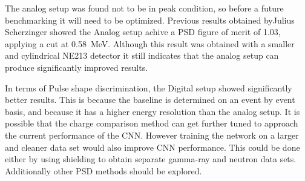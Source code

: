 \documentclass[main.tex]{subfiles}
\begin{document}
The analog setup was found not to be in peak condition, so before a future benchmarking it will need to be optimized. Previous results obtained byJulius Scherzinger showed the Analog setup achive a PSD figure of merit of 1.03, applying a cut at \SI{0.58}{\MeV}\cite{ScherzingerPhd}. Although this result was obtained with a smaller and cylindrical NE213 detector it still indicates that the analog setup can produce significantly improved results.

In terms of Pulse shape discrimination, the Digital setup showed significantly better results. This is because the baseline is determined on an event by event basis, and because it has a higher energy resolution than the analog setup. It is possible that the charge comparison method can get further tuned to approach the current performance of the CNN. However training the network on a larger and cleaner data set would also improve CNN performance. This could be done either by using shielding to obtain separate gamma-ray and neutron data sets. Additionally other PSD methods should be explored.
\end{document}

